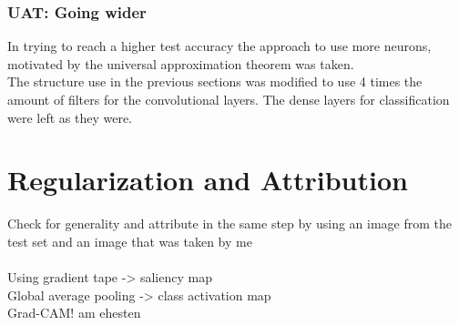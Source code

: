 \documentclass{article}
\begin{document}
\begin{multicols}{2}
\subsubsection{UAT: Going wider}
In trying to reach a higher test accuracy the approach to use more neurons, motivated by the universal approximation theorem was taken.\\
The structure use in the previous sections was modified to use 4 times the amount of filters for the convolutional layers. The dense layers for classification were left as they were.

\section{Regularization and Attribution}
Check for generality and attribute in the same step by using an image from the test set and an image that was taken by me\\
\\
Using gradient tape -> saliency map\\
Global average pooling -> class activation map\\
Grad-CAM! am ehesten

\end{multicols}
\end{document}

